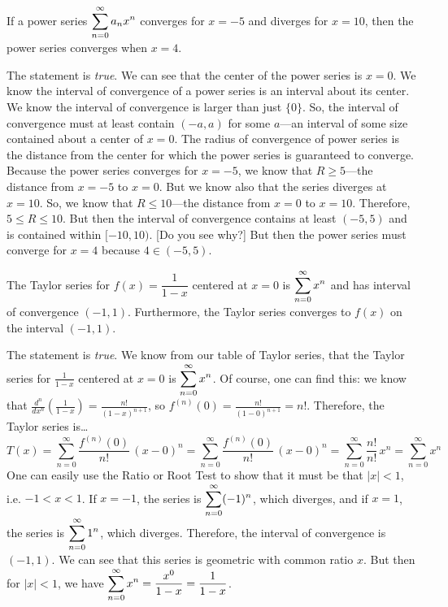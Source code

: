 \documentclass[11pt,letterpaper]{article}
\begin{document}
 If a power series $\displaystyle\sum_{n=0}^\infty a_n x^n$ converges for $x= -5$ and diverges for $x= 10$, then the power series converges when $x= 4$. \pspace

\sol The statement is \textit{true}. We can see that the center of the power series is $x= 0$. We know the interval of convergence of a power series is an interval about its center. We know the interval of convergence is larger than just $\{ 0 \}$. So, the interval of convergence must at least contain $(-a, a)$ for some $a$---an interval of some size contained about a center of $x= 0$. The radius of convergence of power series is the distance from the center for which the power series is guaranteed to converge. Because the power series converges for $x= -5$, we know that $R \geq 5$---the distance from $x= -5$ to $x= 0$. But we know also that the series diverges at $x= 10$. So, we know that $R \leq 10$---the distance from $x= 0$ to $x= 10$. Therefore, $5 \leq R \leq 10$. But then the interval of convergence contains at least $(-5, 5)$ and is contained within $[-10, 10)$. [Do you see why?] But then the power series must converge for $x= 4$ because $4 \in (-5, 5)$. \pvspace{1.3cm}



 The Taylor series for $f(x)= \dfrac{1}{1 - x}$ centered at $x= 0$ is $\displaystyle\sum_{n=0}^\infty x^n$ and has interval of convergence $(-1, 1)$. Furthermore, the Taylor series converges to $f(x)$ on the interval $(-1, 1)$. \pspace

\sol The statement is \textit{true}. We know from our table of Taylor series, that the Taylor series for $\frac{1}{1 - x}$ centered at $x= 0$ is $\displaystyle\sum_{n=0}^\infty x^n$. Of course, one can find this: we know that $\frac{d^n}{dx^n} \left( \frac{1}{1 - x} \right)= \frac{n!}{(1 - x)^{n+1}}$, so $f^{(n)}(0)= \frac{n!}{(1 - 0)^{n+1}}= n!$. Therefore, the Taylor series is\dots
	\[
	T(x)= \sum_{n=0}^\infty \dfrac{f^{(n)}(0)}{n!} \,(x - 0)^n= \sum_{n=0}^\infty \dfrac{f^{(n)}(0)}{n!} \,(x - 0)^n= \sum_{n=0}^\infty \dfrac{n!}{n!} \,x^n= \sum_{n=0}^\infty x^n
	\]
One can easily use the Ratio or Root Test to show that it must be that $|x| < 1$, i.e. $-1 < x < 1$. If $x= -1$, the series is $\displaystyle\sum_{n=0}^\infty (-1)^n$, which diverges, and if $x= 1$, the series is $\displaystyle\sum_{n=0}^\infty 1^n$, which diverges. Therefore, the interval of convergence is $(-1, 1)$. We can see that this series is geometric with common ratio $x$. But then for $|x| < 1$, we have $\displaystyle\sum_{n=0}^\infty x^n= \dfrac{x^0}{1 - x}= \dfrac{1}{1 - x}$. \pvspace{1.3cm}
\end{document}
